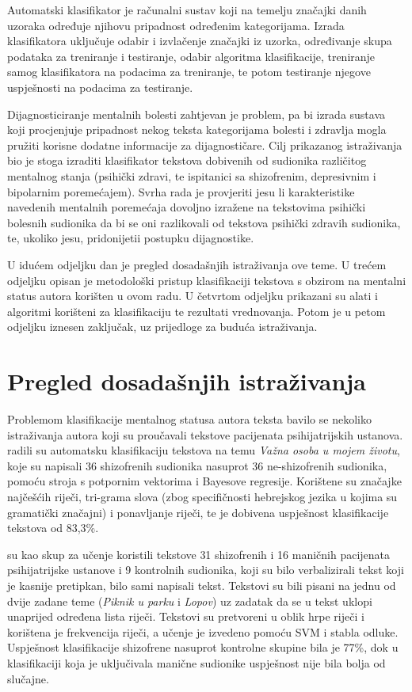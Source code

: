 \documentclass[10pt, a4paper]{article}
\begin{document}
Automatski klasifikator je računalni sustav koji na temelju značajki danih uzoraka određuje njihovu pripadnost određenim kategorijama. Izrada klasifikatora uključuje odabir i izvlačenje značajki iz uzorka, određivanje skupa podataka za treniranje i testiranje, odabir algoritma klasifikacije, treniranje samog klasifikatora na podacima za treniranje, te potom testiranje njegove uspješnosti na podacima za testiranje. 

Dijagnosticiranje mentalnih bolesti zahtjevan je problem, pa bi izrada sustava koji procjenjuje pripadnost nekog teksta kategorijama bolesti i zdravlja mogla pružiti korisne dodatne informacije za dijagnostičare. Cilj prikazanog istraživanja bio je stoga izraditi klasifikator tekstova dobivenih od sudionika različitog mentalnog stanja (psihički zdravi, te ispitanici sa shizofrenim, depresivnim i bipolarnim poremećajem). Svrha rada je provjeriti jesu li karakteristike navedenih mentalnih poremećaja dovoljno izražene na tekstovima psihički bolesnih sudionika da bi se oni razlikovali od tekstova psihički zdravih sudionika, te, ukoliko jesu, pridonijetii postupku dijagnostike.

U idućem odjeljku dan je pregled dosadašnjih istraživanja ove teme. U trećem odjeljku opisan je metodološki pristup klasifikaciji tekstova s obzirom na mentalni status autora korišten u ovom radu. U četvrtom odjeljku prikazani su alati i algoritmi korišteni za klasifikaciju te rezultati vrednovanja. Potom je u petom odjeljku iznesen zaključak, uz prijedloge za buduća istraživanja.

\section{Pregled dosadašnjih istraživanja}
Problemom klasifikacije mentalnog statusa autora teksta bavilo se nekoliko istraživanja autora koji su proučavali tekstove pacijenata psihijatrijskih ustanova. \citet{strous-2009} radili su automatsku klasifikaciju tekstova na temu \emph{Važna osoba u mojem životu}, koje su napisali 36 shizofrenih sudionika nasuprot 36 ne-shizofrenih sudionika, pomoću stroja s potpornim vektorima  i Bayesove regresije. Korištene su značajke najčešćih riječi, tri-grama slova (zbog specifičnosti hebrejskog jezika u kojima su gramatički značajni) i ponavljanje riječi, te je dobivena uspješnost klasifikacije tekstova od 83,3\%.

\citet{exray} su kao skup za učenje koristili tekstove 31 shizofrenih i 16 maničnih pacijenata psihijatrijske ustanove i 9 kontrolnih sudionika, koji su bilo verbalizirali tekst koji je kasnije pretipkan, bilo sami napisali tekst. Tekstovi su bili pisani na jednu od dvije zadane teme (\emph{Piknik u parku} i \emph{Lopov}) uz zadatak da se u tekst uklopi unaprijed određena lista riječi. Tekstovi su pretvoreni u oblik hrpe riječi  i korištena je frekvencija riječi, a učenje je izvedeno pomoću SVM i stabla odluke. Uspješnost klasifikacije shizofrene nasuprot kontrolne skupine bila je 77\%, dok u klasifikaciji koja je uključivala manične sudionike uspješnost nije bila bolja od slučajne. 
\end{document}
